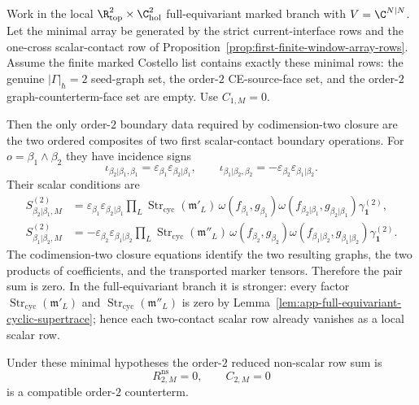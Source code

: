 \begin{prop}\label{prop:order-two-finite-window-boundary-rows}
  Work in the local
  \(\R^2_{\mathrm{top}}\times\C^2_{\mathrm{hol}}\) full-equivariant marked
  branch with \(V=\C^{N|N}\).  Let the minimal array be generated by the
  strict current-interface rows and the one-cross scalar-contact row of
  Proposition~\ref{prop:first-finite-window-array-rows}.  Assume the
  finite marked Costello list contains exactly these minimal rows: the
  genuine \(|\Gamma|_\hbar=2\) seed-graph set, the order-\(2\)
  CE-source-face set, and the order-\(2\) graph-counterterm-face set are
  empty.  Use \(C_{1,M}=0\).

  Then the only order-\(2\) boundary data required by codimension-two closure
  are the two ordered composites of two first scalar-contact boundary
  operations.  For
  \(o=\beta_1\wedge\beta_2\) they have incidence signs
  \[
    \iota_{\beta_2|\beta_1,\beta_1}
      =
    \varepsilon_{\beta_1}\varepsilon_{\beta_2|\beta_1},
    \qquad
    \iota_{\beta_1|\beta_2,\beta_2}
      =
    -\varepsilon_{\beta_2}\varepsilon_{\beta_1|\beta_2}.
  \]
  Their scalar conditions are
  \[
  \begin{aligned}
    S^{(2)}_{\beta_2|\beta_1,M}
      &=
      \varepsilon_{\beta_1}\varepsilon_{\beta_2|\beta_1}
      \prod_L\operatorname{Str}_{\mathrm{cyc}}(\mathfrak m'_L)\,
      \omega(f_{\beta_1},g_{\beta_1})
      \omega(f_{\beta_2|\beta_1},g_{\beta_2|\beta_1})
      \gamma_{\mathbf 1}^{(2)},\\
    S^{(2)}_{\beta_1|\beta_2,M}
      &=
      -\varepsilon_{\beta_2}\varepsilon_{\beta_1|\beta_2}
      \prod_L\operatorname{Str}_{\mathrm{cyc}}(\mathfrak m''_L)\,
      \omega(f_{\beta_2},g_{\beta_2})
      \omega(f_{\beta_1|\beta_2},g_{\beta_1|\beta_2})
      \gamma_{\mathbf 1}^{(2)}.
  \end{aligned}
  \]
  The codimension-two closure equations identify the two resulting graphs,
  the two products of coefficients, and the transported marker tensors.
  Therefore the pair sum is zero.  In the full-equivariant branch it is
  stronger: every factor
  \(\operatorname{Str}_{\mathrm{cyc}}(\mathfrak m'_L)\) and
  \(\operatorname{Str}_{\mathrm{cyc}}(\mathfrak m''_L)\) is zero by
  Lemma~\ref{lem:app-full-equivariant-cyclic-supertrace}; hence each
  two-contact scalar row already vanishes as a local scalar row.

  Under these minimal hypotheses the order-\(2\) reduced non-scalar row sum
  is
  \[
    R^{\mathrm{ns}}_{2,M}=0,
    \qquad
    C_{2,M}=0
  \]
  is a compatible order-\(2\) counterterm.


\end{prop}

